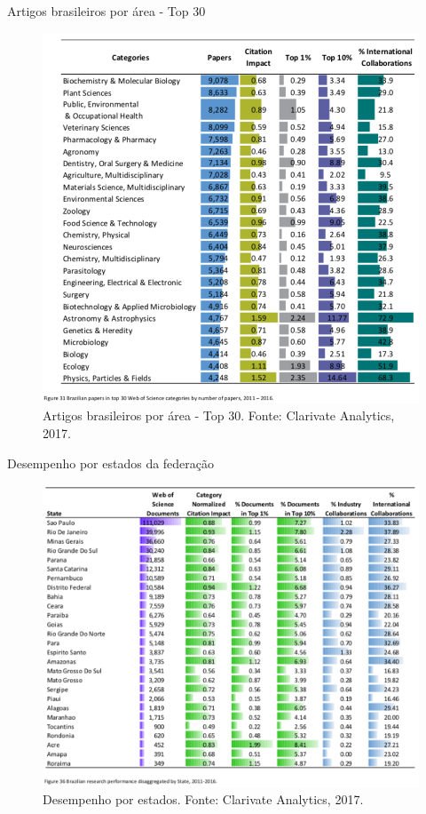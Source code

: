 \begin{frame}{Artigos brasileiros por área - Top 30}
\begin{figure}
\centering
\includegraphics[scale=0.25]{figs/01/panorama-top30}
\caption{\scriptsize{Artigos brasileiros por área - Top 30. Fonte: Clarivate Analytics, 2017.}}
\end{figure}
\end{frame}

\begin{frame}{Desempenho por estados da federação}
\begin{figure}
\centering
\includegraphics[scale=0.2]{figs/01/panorama-estados}
\caption{\scriptsize{Desempenho por estados. Fonte: Clarivate Analytics, 2017.}}
\end{figure}
\end{frame}

